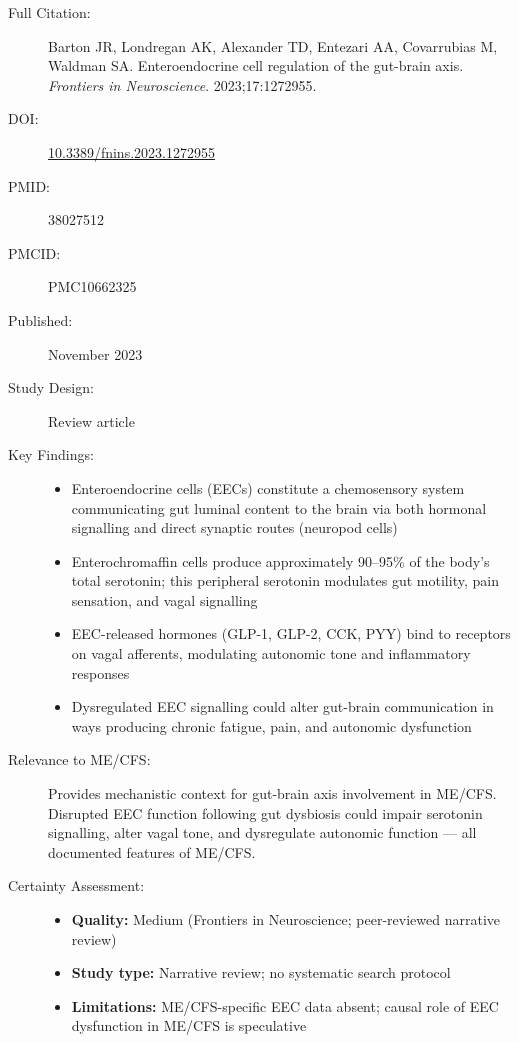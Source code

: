 \begin{description}
    \item[Full Citation:] Barton JR, Londregan AK, Alexander TD, Entezari AA, Covarrubias M, Waldman SA. Enteroendocrine cell regulation of the gut-brain axis. \textit{Frontiers in Neuroscience}. 2023;17:1272955.
    \item[DOI:] \href{https://doi.org/10.3389/fnins.2023.1272955}{10.3389/fnins.2023.1272955}
    \item[PMID:] 38027512
    \item[PMCID:] PMC10662325
    \item[Published:] November 2023
    \item[Study Design:] Review article
    \item[Key Findings:]
    \begin{itemize}
        \item Enteroendocrine cells (EECs) constitute a chemosensory system communicating gut luminal content to the brain via both hormonal signalling and direct synaptic routes (neuropod cells)
        \item Enterochromaffin cells produce approximately 90--95\% of the body's total serotonin; this peripheral serotonin modulates gut motility, pain sensation, and vagal signalling
        \item EEC-released hormones (GLP-1, GLP-2, CCK, PYY) bind to receptors on vagal afferents, modulating autonomic tone and inflammatory responses
        \item Dysregulated EEC signalling could alter gut-brain communication in ways producing chronic fatigue, pain, and autonomic dysfunction
    \end{itemize}
    \item[Relevance to ME/CFS:] Provides mechanistic context for gut-brain axis involvement in ME/CFS. Disrupted EEC function following gut dysbiosis could impair serotonin signalling, alter vagal tone, and dysregulate autonomic function --- all documented features of ME/CFS.
    \item[Certainty Assessment:]
    \begin{itemize}
        \item \textbf{Quality:} Medium (Frontiers in Neuroscience; peer-reviewed narrative review)
        \item \textbf{Study type:} Narrative review; no systematic search protocol
        \item \textbf{Limitations:} ME/CFS-specific EEC data absent; causal role of EEC dysfunction in ME/CFS is speculative
    \end{itemize}
\end{description}

